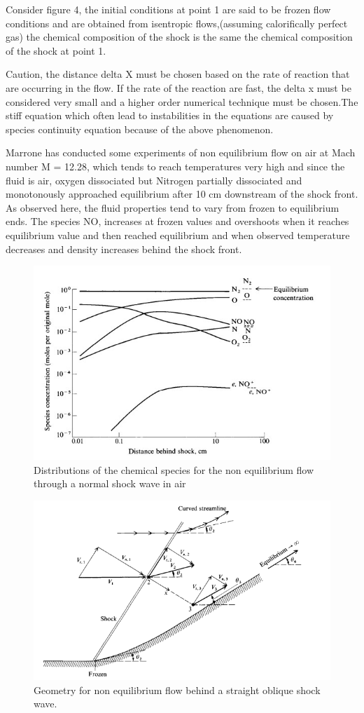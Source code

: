 Consider figure 4, the initial conditions at point 1 are said to be frozen flow conditions and are obtained from isentropic flows,(assuming calorifically perfect gas) the chemical composition of the shock is the same the chemical composition of the shock at point 1.

Caution, the distance delta X must be chosen based on the rate of reaction that are occurring in the flow. If the rate of the reaction are fast, the delta x must be considered very small and a higher order numerical technique must be chosen.The stiff equation which often lead to instabilities in the equations are caused by species continuity equation because of the above phenomenon.

Marrone has conducted some experiments of non equilibrium flow on air at Mach number M = 12.28, which tends to reach temperatures very high and since the fluid is air, oxygen dissociated but Nitrogen partially dissociated and monotonously approached equilibrium after 10 cm downstream of the shock front.
As observed here, the fluid properties tend to vary from frozen to equilibrium ends. The species NO, increases at frozen values and overshoots when it reaches equilibrium value and then reached equilibrium and when observed temperature decreases and density increases behind the shock front.

\begin{figure}[ht]

\centering
  \includegraphics[width=0.7\linewidth]{images/species_dissociation.jpg}
  \caption{Distributions of the chemical species for the non equilibrium flow through
a normal shock wave in air}
  \label{fig:boat1}
\end{figure}

\begin{figure}[ht]

\centering
  \includegraphics[width=0.7\linewidth]{images/oblique_shock.png}
  \caption{Geometry for non equilibrium flow behind a straight oblique shock
wave.}
  \label{fig:boat1}
\end{figure}

